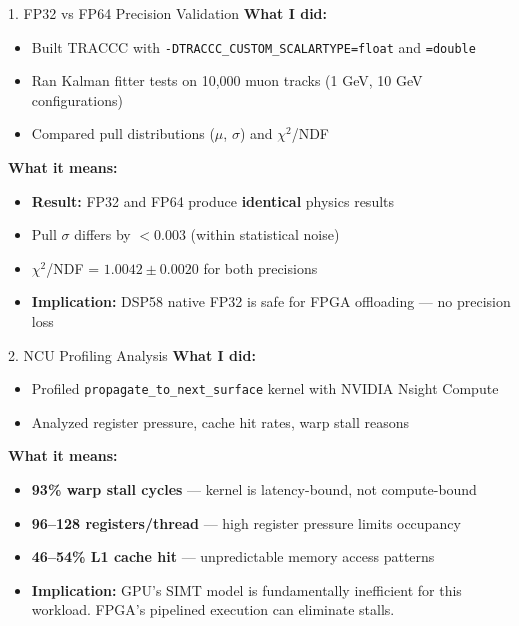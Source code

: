 \documentclass[aspectratio=169, table]{beamer}
\begin{document}
\begin{frame}{1. FP32 vs FP64 Precision Validation}
\textbf{What I did:}
\begin{itemize}
    \item Built TRACCC with \texttt{-DTRACCC\_CUSTOM\_SCALARTYPE=float} and \texttt{=double}
    \item Ran Kalman fitter tests on 10,000 muon tracks (1 GeV, 10 GeV configurations)
    \item Compared pull distributions ($\mu$, $\sigma$) and $\chi^2$/NDF
\end{itemize}

\vspace{0.5em}
\textbf{What it means:}
\begin{itemize}
    \item \textbf{Result:} FP32 and FP64 produce \textbf{identical} physics results
    \item Pull $\sigma$ differs by $<0.003$ (within statistical noise)
    \item $\chi^2$/NDF = $1.0042 \pm 0.0020$ for both precisions
    \item \textbf{Implication:} DSP58 native FP32 is safe for FPGA offloading --- no precision loss
\end{itemize}
\end{frame}

\begin{frame}{2. NCU Profiling Analysis}
\textbf{What I did:}
\begin{itemize}
    \item Profiled \texttt{propagate\_to\_next\_surface} kernel with NVIDIA Nsight Compute
    \item Analyzed register pressure, cache hit rates, warp stall reasons
\end{itemize}

\vspace{0.5em}
\textbf{What it means:}
\begin{itemize}
    \item \textbf{93\% warp stall cycles} --- kernel is latency-bound, not compute-bound
    \item \textbf{96--128 registers/thread} --- high register pressure limits occupancy
    \item \textbf{46--54\% L1 cache hit} --- unpredictable memory access patterns
    \item \textbf{Implication:} GPU's SIMT model is fundamentally inefficient for this workload. FPGA's pipelined execution can eliminate stalls.
\end{itemize}
\end{frame}
\end{document}
